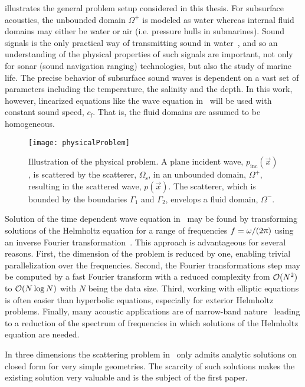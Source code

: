  illustrates the general problem setup considered in this thesis. For subsurface acoustics, the unbounded domain $\Omega^+$ is modeled as water whereas internal fluid domains may either be water or air (i.e. pressure hulls in submarines). Sound signals is the only practical way of transmitting sound in water~\cite{Jensen2011coa}, and so an understanding of the physical properties of such signals are important, not only for sonar (sound navigation ranging) technologies, but also the study of marine life. The precise behavior of subsurface sound waves is dependent on a vast set of parameters including the temperature, the salinity and the depth. In this work, however, linearized equations like the wave equation in~ will be used with constant sound speed, $c_{\mathrm{f}}$. That is, the fluid domains are assumed to be homogeneous.
\begin{figure}
	\centering
	\texttt{[image: physicalProblem]}
	\caption{Illustration of the physical problem. A plane incident wave, $p_{\mathrm{inc}}(\vec{x})$, is scattered by the scatterer, $\Omega_{\mathrm{s}}$, in an unbounded domain, $\Omega^+$, resulting in the scattered wave, $p(\vec{x})$. The scatterer, which is bounded by the boundaries $\Gamma_1$ and $\Gamma_2$, envelops a fluid domain, $\Omega^-$.}
	\label{Fig:physicalProblem}
\end{figure}

Solution of the time dependent wave equation in~ may be found by transforming solutions of the Helmholtz equation for a range of frequencies ${f=\omega/(2\uppi)}$ using an inverse Fourier transformation~\cite{Jensen2011coa}. This approach is advantageous for several reasons. First, the dimension of the problem is reduced by one, enabling trivial parallelization over the frequencies. Second, the Fourier transformations step may be computed by a fast Fourier transform with a reduced complexity from $\mathcal{O}(N^2)$ to $\mathcal{O}(N\log N)$ with $N$ being the data size. Third, working with elliptic equations is often easier than hyperbolic equations, especially for exterior Helmholtz problems. Finally, many acoustic applications are of narrow-band nature~\cite{Jensen2011coa} leading to a reduction of the spectrum of frequencies in which solutions of the Helmholtz equation are needed.

In three dimensions the scattering problem in~ only admits analytic solutions on closed form for very simple geometries. The scarcity of such solutions makes the existing solution very valuable and is the subject of the first paper. 

